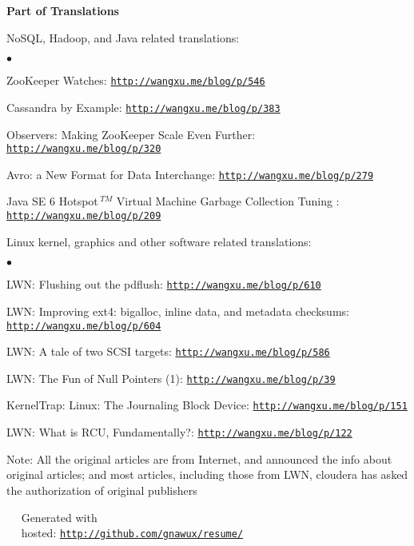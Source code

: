 \documentclass[a4paper,margin,line]{res}
\newenvironment{list1}{
  \begin{list}{\ding{113}}{%
      \setlength{\itemsep}{0in}
      \setlength{\parsep}{0in} \setlength{\parskip}{0in}
      \setlength{\topsep}{0in} \setlength{\partopsep}{0in} 
      \setlength{\leftmargin}{0.17in}}}{\end{list}}
\newenvironment{list2}{
  \begin{list}{$\bullet$}{%
      \setlength{\itemsep}{0in}
      \setlength{\parsep}{0in} \setlength{\parskip}{0in}
      \setlength{\topsep}{0in} \setlength{\partopsep}{0in} 
      \setlength{\leftmargin}{0.2in}}}{\end{list}}
\newcommand{\http}{http:/\hspace{-0.3ex}/}
\newcommand{\hindent}{\mbox{\hspace{8ex}}}
\begin{document}
\begin{resume}
\textbf{Part of Translations}\\
\vspace*{-.1in}
\begin{list1}
\item[] NoSQL, Hadoop, and Java related translations:
\begin{list2}
\vspace*{.05in}
\item ZooKeeper Watches: \href{http://wangxu.me/blog/p/546}{\tt\http{}wangxu.me/blog/p/546}
\item Cassandra by Example: \href{http://wangxu.me/blog/p/383}{\tt\http{}wangxu.me/blog/p/383}
\item Observers: Making ZooKeeper Scale Even Further: \href{http://wangxu.me/blog/p/320}{\tt\http{}wangxu.me/blog/p/320}
\item Avro: a New Format for Data Interchange: \href{http://wangxu.me/blog/p/279}{\tt\http{}wangxu.me/blog/p/279}
\item Java SE 6 Hotspot${\,}^{TM}$ Virtual Machine Garbage Collection Tuning : \\
    \hindent\href{http://wangxu.me/blog/p/209}{\tt\http{}wangxu.me/blog/p/209}
\vspace*{.05in}
\end{list2}
\item[] Linux kernel, graphics and other software related translations:
\begin{list2}
\vspace*{.05in}
\item LWN: Flushing out the pdflush: \href{http://wangxu.me/blog/p/610}{\tt\http{}wangxu.me/blog/p/610}
\item LWN: Improving ext4: bigalloc, inline data, and metadata checksums: \\ \hindent \href{http://wangxu.me/blog/p/604}{\tt\http{}wangxu.me/blog/p/604}
\item LWN: A tale of two SCSI targets: \href{http://wangxu.me/blog/p/586}{\tt \http{}wangxu.me/blog/p/586}
\item LWN: The Fun of Null Pointers (1): \href{http://wangxu.me/blog/p/39}{\tt\http{}wangxu.me/blog/p/39}
\item KernelTrap: Linux: The Journaling Block Device: \href{http://wangxu.me/blog/p/151}{\tt\http{}wangxu.me/blog/p/151}
\item LWN: What is RCU, Fundamentally?: \enskip\href{http://wangxu.me/blog/p/122}{\tt\http{}wangxu.me/blog/p/122}
\end{list2}
\end{list1}
{\small \textsf{Note: All the original articles are from Internet, and announced the info about original articles; and most articles, including those from LWN, cloudera has asked the authorization of original publishers}}

\end{resume}

\vfill
\vfill
\mbox{ }\hspace{100pt}	\small\Resume\ Generated with \\
\mbox{ }\hspace{50pt}	\small\Resume\ hosted: \href{http://github.com/gnawux/resume/}{\tt\http{}github.com/gnawux/resume/}
\end{document}
